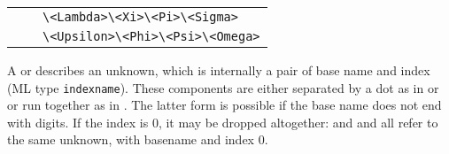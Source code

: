\begin{isabellebody}
\begin{isamarkuptext}
\begin{center}
\begin{supertabular}{rcl}
          &   & \verb|\<Lambda>|\verb|\<Xi>|\verb|\<Pi>|\verb|\<Sigma>| \\
          &   & \verb|\<Upsilon>|\verb|\<Phi>|\verb|\<Psi>|\verb|\<Omega>| \\
  \end{supertabular}
  \end{center}

  A \hyperlink{syntax.var}{\mbox{}} or \hyperlink{syntax.typevar}{\mbox{}} describes an unknown,
  which is internally a pair of base name and index (ML type \verb|indexname|).  These components are either separated by a dot as in
   or  or run together as in .  The latter form is possible if the base name does not end
  with digits.  If the index is 0, it may be dropped altogether:
   and  and  all refer to the
  same unknown, with basename  and index 0.


\end{isamarkuptext}
\end{isabellebody}
